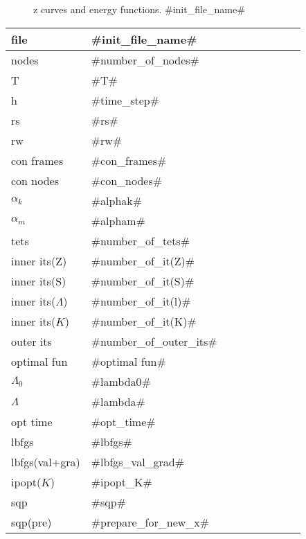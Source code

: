 
\begin{figure}
  \centering
  \caption{z curves and energy functions. #init_file_name#}
  \label{en_f}
\end{figure}

\begin{center}
  \begin{tabular}{|l*{8}{|l}}
    \hline
	file & #init_file_name# \\ \hline
	nodes & #number_of_nodes# \\ \hline
	T & #T# \\ \hline
	h & #time_step# \\ \hline
	rs & #rs# \\ \hline
	rw & #rw# \\ \hline
    con frames & #con_frames#\\\hline
    con nodes & #con_nodes#\\\hline
	$\alpha_k$ & #alphak# \\ \hline
	$\alpha_m$ & #alpham# \\ \hline
	tets & #number_of_tets# \\ \hline
    inner its(Z) & #number_of_it(Z)# \\ \hline
    inner its(S) & #number_of_it(S)# \\ \hline
    inner its($\Lambda$) & #number_of_it(l)# \\ \hline
    inner its($K$) & #number_of_it(K)# \\ \hline
    outer its & #number_of_outer_its# \\ \hline
    optimal fun & #optimal fun# \\ \hline
	$\Lambda_0$ & #lambda0# \\ \hline 
	$\Lambda$ & #lambda# \\ \hline 
    opt time & #opt_time# \\ \hline 
    lbfgs & #lbfgs# \\ \hline
    lbfgs(val+gra) & #lbfgs_val_grad# \\ \hline
    ipopt($K$) & #ipopt_K# \\ \hline
    sqp & #sqp# \\ \hline
    sqp(pre) & #prepare_for_new_x# \\ \hline

\end{tabular}
\end{center}
